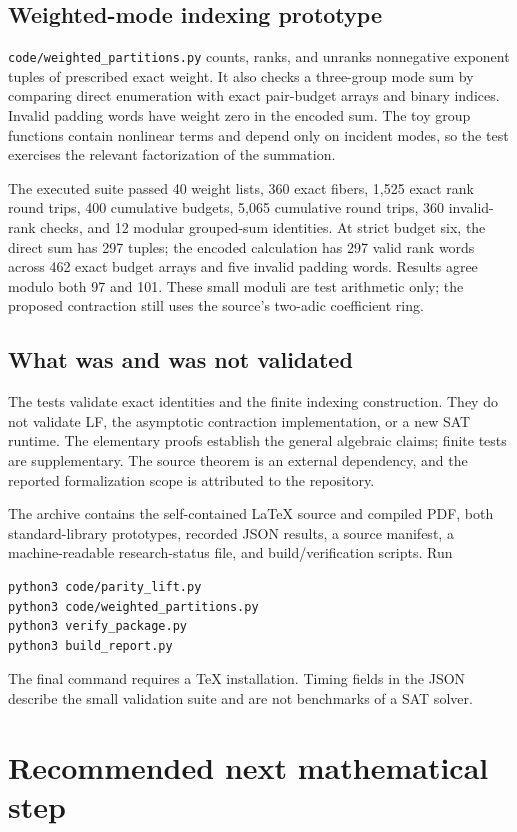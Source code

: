 \documentclass[11pt]{article}
\theoremstyle{definition}
\theoremstyle{remark}
\begin{document}
\subsection{Weighted-mode indexing prototype}
\texttt{code/weighted\_partitions.py} counts, ranks, and unranks nonnegative
exponent tuples of prescribed exact weight. It also checks a three-group mode
sum by comparing direct enumeration with exact pair-budget arrays and
binary indices. Invalid padding words have weight zero in the encoded sum.
The toy group functions contain nonlinear terms and depend only on incident
modes, so the test exercises the relevant factorization of the summation.

The executed suite passed 40 weight lists, 360 exact fibers, 1,525 exact
rank round trips, 400 cumulative budgets, 5,065 cumulative round trips,
360 invalid-rank checks, and 12 modular grouped-sum identities. At strict
budget six, the direct sum has 297 tuples; the encoded calculation has 297
valid rank words across 462 exact budget arrays and five invalid padding
words. Results agree modulo both 97 and 101. These small moduli are test
arithmetic only; the proposed contraction still uses the source's two-adic
coefficient ring.

\subsection{What was and was not validated}
The tests validate exact identities and the finite indexing construction.
They do not validate LF, the asymptotic contraction implementation, or a new
SAT runtime. The elementary proofs establish the general algebraic claims;
finite tests are supplementary. The source theorem is an external dependency,
and the reported formalization scope is attributed to the repository.

The archive contains the self-contained LaTeX source and compiled PDF, both
standard-library prototypes, recorded JSON results, a source manifest, a
machine-readable research-status file, and build/verification scripts. Run
\begin{Verbatim}[fontsize=\small]
python3 code/parity_lift.py
python3 code/weighted_partitions.py
python3 verify_package.py
python3 build_report.py
\end{Verbatim}
The final command requires a TeX installation. Timing fields in the JSON
describe the small validation suite and are not benchmarks of a SAT solver.

\section{Recommended next mathematical step}
\end{document}
